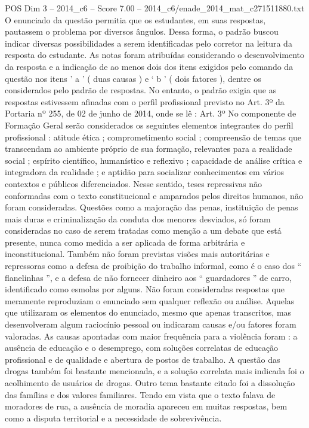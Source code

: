 \begin{textsample}{POS Dim 3 – 2014\_c6 – Score 7.00 – 2014\_c6/enade\_2014\_mat\_c271511880.txt}
O enunciado da questão permitia que os estudantes, em suas respostas, pautassem o problema por diversos ângulos.
Dessa forma, o padrão buscou indicar diversas possibilidades a serem identificadas pelo corretor na leitura da resposta do estudante.
As notas foram atribuídas considerando o desenvolvimento da resposta e a indicação de ao menos dois dos itens exigidos pelo comando da questão nos itens ’ a ’ ( duas causas ) e ‘ b ’ ( dois fatores ), dentre os considerados pelo padrão de respostas.
No entanto, o padrão exigia que as respostas estivessem afinadas com o perfil profissional previsto no Art. 3º da Portaria nº 255, de 02 de junho de 2014, onde se lê : Art. 3º No componente de Formação Geral serão considerados os seguintes elementos integrantes do perfil profissional : atitude ética ; comprometimento social ; compreensão de temas que transcendam ao ambiente próprio de sua formação, relevantes para a realidade social ; espírito científico, humanístico e reflexivo ; capacidade de análise crítica e integradora da realidade ; e aptidão para socializar conhecimentos em vários contextos e públicos diferenciados.
Nesse sentido, teses repressivas não conformadas com o texto constitucional e amparados pelos direitos humanos, não foram consideradas.
Questões como a majoração das penas, instituição de penas mais duras e criminalização da conduta dos menores desviados, só foram consideradas no caso de serem tratadas como menção a um debate que está presente, nunca como medida a ser aplicada de forma arbitrária e inconstitucional.
Também não foram previstas visões mais autoritárias e repressoras como a defesa de proibição do trabalho informal, como é o caso dos “ flanelinhas ”, e a defesa de não fornecer dinheiro aos “ guardadores ” de carro, identificado como esmolas por alguns.
Não foram consideradas respostas que meramente reproduziam o enunciado sem qualquer reflexão ou análise.
Aquelas que utilizaram os elementos do enunciado, mesmo que apenas transcritos, mas desenvolveram algum raciocínio pessoal ou indicaram causas e/ou fatores foram valoradas.
As causas apontadas com maior frequência para a violência foram : a ausência de educação e o desemprego, com soluções correlatas de educação profissional e de qualidade e abertura de postos de trabalho.
A questão das drogas também foi bastante mencionada, e a solução correlata mais indicada foi o acolhimento de usuários de drogas.
Outro tema bastante citado foi a dissolução das famílias e dos valores familiares.
Tendo em vista que o texto falava de moradores de rua, a ausência de moradia apareceu em muitas respostas, bem como a disputa territorial e a necessidade de sobrevivência.

\end{textsample}
